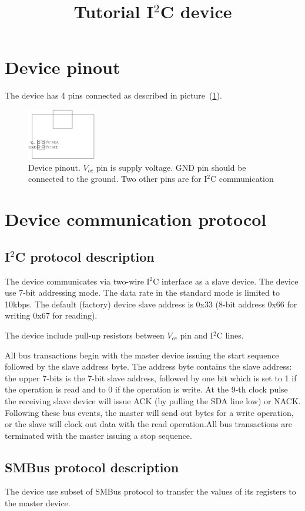 \documentclass{article}
\begin{document}
\title{Tutorial I$^2$C device}
\maketitle
\section{Device pinout}
The device has 4 pins connected as described in picture~(\ref{l-pinout}).
\begin{figure}[h]
  \includegraphics[width=3cm]{pinout}
  \caption{Device pinout. $V_{cc}$ pin is supply voltage. GND pin should be connected to the ground. Two other pins are for I$^2$C communication}\label{l-pinout}
\end{figure}
\section{Device communication protocol}
\subsection{I$^2$C protocol description}
The device communicates via two-wire I$^2$C interface as a slave device. The device use 7-bit addressing mode. The data rate in the standard mode is limited to 10kbps. The default (factory) device slave address is 0x33 (8-bit address 0x66 for writing 0x67 for reading). 

The device include pull-up resistors between $V_{cc}$ pin and I$^2$C lines.

All bus transactions begin with the master device issuing the start sequence followed by the slave address byte. The address byte contains the slave address: the upper 7-bits is the 7-bit slave address, followed by one bit which is set to 1 if the operation is read and to 0 if the operation is write. At the 9-th clock pulse the receiving slave device will issue ACK (by pulling the SDA line low) or NACK. Following these bus events, the master will send out bytes for a write operation, or the slave will clock out data with the read operation.All bus transactions are terminated with the master issuing a stop sequence. 

\subsection{SMBus protocol description}
The device use subset of SMBus protocol to transfer the values of its registers to the master device.
\end{document}

